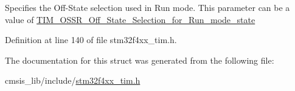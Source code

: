 Specifies the Off-\/\+State selection used in Run mode. This parameter can be a value of \hyperlink{group___t_i_m___o_s_s_r___off___state___selection__for___run__mode__state}{T\+I\+M\+\_\+\+O\+S\+S\+R\+\_\+\+Off\+\_\+\+State\+\_\+\+Selection\+\_\+for\+\_\+\+Run\+\_\+mode\+\_\+state} 

Definition at line 140 of file stm32f4xx\+\_\+tim.\+h.



The documentation for this struct was generated from the following file\+:\begin{DoxyCompactItemize}
\item 
cmsis\+\_\+lib/include/\hyperlink{stm32f4xx__tim_8h}{stm32f4xx\+\_\+tim.\+h}\end{DoxyCompactItemize}
